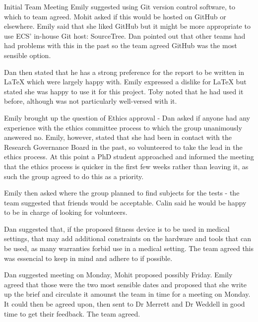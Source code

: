 \documentclass{article}
\begin{document}
\begin{Minutes}{Initial Team Meeting}
Emily suggested using Git version control software, to which to team
agreed. Mohit asked if this would be hosted on GitHub or elsewhere. Emily
said that she liked GitHub but it might be more appropriate to use ECS'
in-house Git host: SourceTree. Dan pointed out that other teams had had
problems with this in the past so the team agreed GitHub was the most
sensible option.

Dan then stated that he has a strong preference for the report to be
written in LaTeX which were largely happy with. Emily expressed a dislike
for LaTeX but stated she was happy to use it for this project. Toby noted
that he had used it before, although was not particularly well-versed
with it.

Emily brought up the question of Ethics approval - Dan asked if anyone
had any experience with the ethics committee process to which the group
unanimously answered no. Emily, however, stated that she had been in
contact with the Research Governance Board in the past, so volunteered to
take the lead in the ethics process. At this point a PhD student
approached and informed the meeting that the ethics process is quicker in
the first few weeks rather than leaving it, as such the group agreed to
do this as a priority.

Emily then asked where the group planned to find subjects for the tests
- the team suggested that friends would be acceptable. Calin said he
would be happy to be in charge of looking for volunteers.

Dan suggested that, if the proposed fitness device is to be used in
medical settings, that may add additional constraints on the hardware
and tools that can be used, as many warranties forbid use in a medical
setting. The team agreed this was essencial to keep in mind and adhere
to if possible.

Dan suggested meeting on Monday, Mohit proposed possibly Friday. Emily
agreed that those were the two most sensible dates and proposed that she
write up the brief and circulate it amounst the team in time for a
meeting on Monday. It could then be agreed upon, then sent to Dr Merrett
and Dr Weddell in good time to get their feedback. The team agreed.


\end{Minutes}
\end{document}
